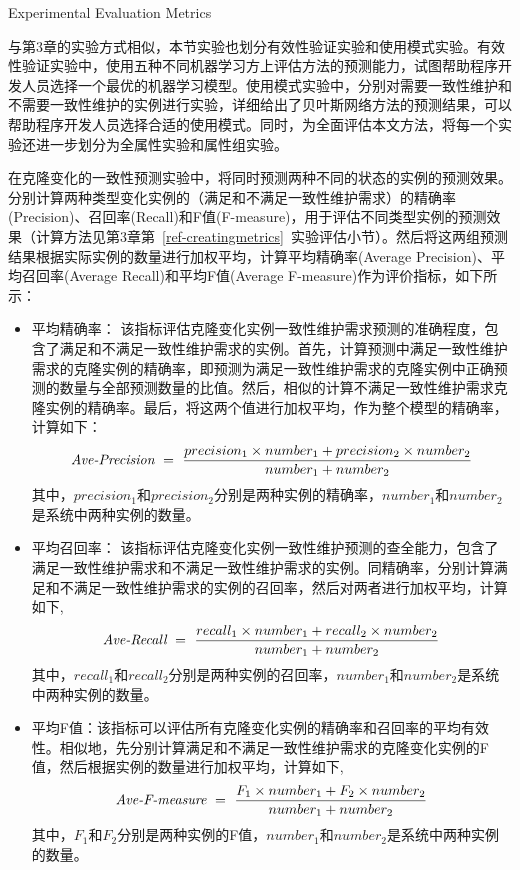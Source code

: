 {Experimental Evaluation Metrics}
\label{ref-changingmetrics}

与第3章的实验方式相似，本节实验也划分有效性验证实验和使用模式实验。有效性验证实验中，使用五种不同机器学习方上评估方法的预测能力，试图帮助程序开发人员选择一个最优的机器学习模型。使用模式实验中，分别对需要一致性维护和不需要一致性维护的实例进行实验，详细给出了贝叶斯网络方法的预测结果，可以帮助程序开发人员选择合适的使用模式。同时，为全面评估本文方法，将每一个实验还进一步划分为全属性实验和属性组实验。

在克隆变化的一致性预测实验中，将同时预测两种不同的状态的实例的预测效果。分别计算两种类型变化实例的（满足和不满足一致性维护需求）的精确率(Precision)、召回率(Recall)和F值(F-measure)，用于评估不同类型实例的预测效果（计算方法见第3章第~\ref{ref-creatingmetrics}~实验评估小节）。然后将这两组预测结果根据实际实例的数量进行加权平均，计算平均精确率(Average Precision)、平均召回率(Average Recall)和平均F值(Average F-measure)作为评价指标，如下所示：

\begin{itemize}
\item
平均精确率： 该指标评估克隆变化实例一致性维护需求预测的准确程度，包含了满足和不满足一致性维护需求的实例。首先，计算预测中满足一致性维护需求的克隆实例的精确率，即预测为满足一致性维护需求的克隆实例中正确预测的数量与全部预测数量的比值。然后，相似的计算不满足一致性维护需求克隆实例的精确率。最后，将这两个值进行加权平均，作为整个模型的精确率，计算如下：
\begin{equation} 
\mbox{\it Ave-Precision} ~=~ {\frac {precision_1 \times number_1 + precision_2 \times number_2}{number_1 + number_2}}
\end{equation}
其中，$precision_1$和$precision_2$分别是两种实例的精确率，$number_1$和$number_2$是系统中两种实例的数量。
\item
平均召回率： 该指标评估克隆变化实例一致性维护预测的查全能力，包含了满足一致性维护需求和不满足一致性维护需求的实例。同精确率，分别计算满足和不满足一致性维护需求的实例的召回率，然后对两者进行加权平均，计算如下,
\begin{equation} 
\mbox{\it Ave-Recall} ~=~ {\frac  {recall_1 \times number_1 + recall_2 \times number_2}{number_1 + number_2}}
\end{equation}
其中，$recall_1$和$recall_2$分别是两种实例的召回率，$number_1$和$number_2$是系统中两种实例的数量。
\item
平均F值：该指标可以评估所有克隆变化实例的精确率和召回率的平均有效性。相似地，先分别计算满足和不满足一致性维护需求的克隆变化实例的F值，然后根据实例的数量进行加权平均，计算如下,
\begin{equation} 
\mbox{\it Ave-F-measure} ~=~ {\frac  {F_1 \times number_1 + F_2 \times number_2}{number_1 + number_2}}
\end{equation}
其中，$F_1$和$F_2$分别是两种实例的F值，$number_1$和$number_2$是系统中两种实例的数量。
\end{itemize}

